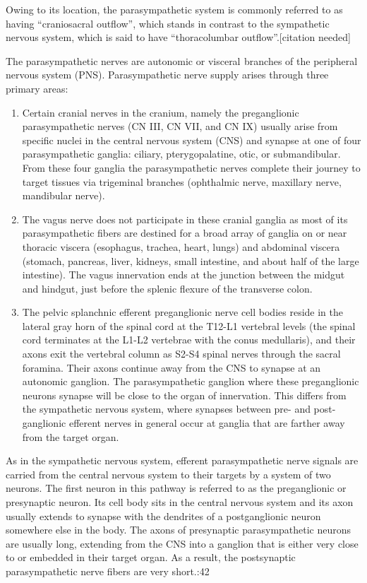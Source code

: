 Owing to its location, the parasympathetic system is commonly referred to as having ``craniosacral outflow'', which stands in contrast to the sympathetic nervous system, which is said to have ``thoracolumbar outflow''.{[}citation needed{]}

The parasympathetic nerves are autonomic or visceral  branches of the peripheral nervous system (PNS). Parasympathetic nerve supply arises through three primary areas:

\begin{enumerate}
\def\labelenumi{\arabic{enumi}.}
\tightlist
\item
  Certain cranial nerves in the cranium, namely the preganglionic parasympathetic nerves (CN III, CN VII, and CN IX) usually arise from specific nuclei in the central nervous system (CNS) and synapse at one of four parasympathetic ganglia: ciliary, pterygopalatine, otic, or submandibular. From these four ganglia the parasympathetic nerves complete their journey to target tissues via trigeminal branches (ophthalmic nerve, maxillary nerve, mandibular nerve).
\item
  The vagus nerve does not participate in these cranial ganglia as most of its parasympathetic fibers are destined for a broad array of ganglia on or near thoracic viscera (esophagus, trachea, heart, lungs) and abdominal viscera (stomach, pancreas, liver, kidneys, small intestine, and about half of the large intestine). The vagus innervation ends at the junction between the midgut and hindgut, just before the splenic flexure of the transverse colon.
\item
  The pelvic splanchnic efferent preganglionic nerve cell bodies reside in the lateral gray horn of the spinal cord at the T12-L1 vertebral levels (the spinal cord terminates at the L1-L2 vertebrae with the conus medullaris), and their axons exit the vertebral column as S2-S4 spinal nerves through the sacral foramina. Their axons continue away from the CNS to synapse at an autonomic ganglion. The parasympathetic ganglion where these preganglionic neurons synapse will be close to the organ of innervation. This differs from the sympathetic nervous system, where synapses between pre- and post-ganglionic efferent nerves in general occur at ganglia that are farther away from the target organ.
\end{enumerate}

As in the sympathetic nervous system, efferent parasympathetic nerve signals are carried from the central nervous system to their targets by a system of two neurons. The first neuron in this pathway is referred to as the preganglionic or presynaptic neuron. Its cell body sits in the central nervous system and its axon usually extends to synapse with the dendrites of a postganglionic neuron somewhere else in the body. The axons of presynaptic parasympathetic neurons are usually long, extending from the CNS into a ganglion that is either very close to or embedded in their target organ. As a result, the postsynaptic parasympathetic nerve fibers are very short.:42

